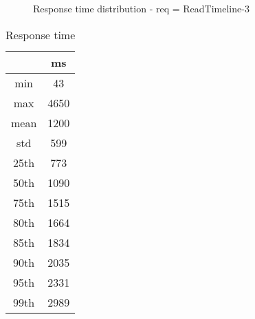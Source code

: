 \begin{minipage}{0.75\linewidth}
\begin{figure}[h]
\begin{adjustbox}{max width=1.0\linewidth, keepaspectratio}
  \end{adjustbox}
  \caption{Response time distribution - req = ReadTimeline-3}
\end{figure}
\end{minipage}\hfill\begin{minipage}{0.18\linewidth}
\begin{table}[h]
\begin{tabular}{|cc|}
\hline
\textbf{} & \textbf{ms}\\ \hline
 \Xhline{0.005\arrayrulewidth}
min & 43\\
 \Xhline{0.005\arrayrulewidth}
max & 4650\\
 \Xhline{0.005\arrayrulewidth}
mean & 1200\\
 \Xhline{0.005\arrayrulewidth}
std & 599\\
\hline
\hline
 \Xhline{0.005\arrayrulewidth}
25th & 773\\
 \Xhline{0.005\arrayrulewidth}
50th & 1090\\
 \Xhline{0.005\arrayrulewidth}
75th & 1515\\
 \Xhline{0.005\arrayrulewidth}
80th & 1664\\
 \Xhline{0.005\arrayrulewidth}
85th & 1834\\
 \Xhline{0.005\arrayrulewidth}
90th & 2035\\
 \Xhline{0.005\arrayrulewidth}
95th & 2331\\
 \Xhline{0.005\arrayrulewidth}
99th & 2989\\
\hline
\end{tabular}
\caption{Response time}
\end{table}
\end{minipage}\hfill